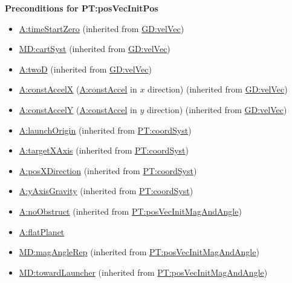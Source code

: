 \documentclass[12pt]{article}
\begin{document}
\noindent \textbf{Preconditions for PT:posVecInitPos} 
\begin{itemize} 
\item \hyperref[timeStartZero]{A:timeStartZero} (inherited from
\hyperref[GD:velVec]{GD:velVec}) 
\item \hyperref[MD:cartSyst]{MD:cartSyst}
(inherited from \hyperref[GD:velVec]{GD:velVec}) 
\item \hyperref[twoD]{A:twoD}
(inherited from \hyperref[GD:velVec]{GD:velVec}) 
\item
\hyperref[constAccelX]{A:constAccelX} (\hyperref[constAccel]{A:constAccel} in
$x$ direction) (inherited from \hyperref[GD:velVec]{GD:velVec}) 
\item
\hyperref[constAccelY]{A:constAccelY} (\hyperref[constAccel]{A:constAccel} in
$y$ direction) (inherited from \hyperref[GD:velVec]{GD:velVec}) 
\item
\hyperref[launchOrigin]{A:launchOrigin} (inherited from
\hyperref[PT:coordSyst]{PT:coordSyst}) 
\item
\hyperref[targetXAxis]{A:targetXAxis} (inherited from
\hyperref[PT:coordSyst]{PT:coordSyst}) 
\item \hyperref[posXDirection]{A:posXDirection} (inherited from
\hyperref[PT:coordSyst]{PT:coordSyst}) 
\item \hyperref[yAxisGravity]{A:yAxisGravity} (inherited from
\hyperref[PT:coordSyst]{PT:coordSyst}) 
\item \hyperref[noObstruct]{A:noObstruct} (inherited from \hyperref[PT:posVecInitMagAndAngle]{PT:posVecInitMagAndAngle})
\item \hyperref[flatPlanet]{A:flatPlanet}
\item \hyperref[MD:magAngleRep]{MD:magAngleRep} (inherited from \hyperref[PT:posVecInitMagAndAngle]{PT:posVecInitMagAndAngle})
\item \hyperref[MD:towardLauncher]{MD:towardLauncher} (inherited from \hyperref[PT:posVecInitMagAndAngle]{PT:posVecInitMagAndAngle})
\end{itemize} 
\end{document}
